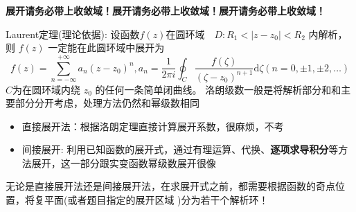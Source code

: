 \documentclass[a4paper,11pt,UTF8]{article}
\begin{document}
\begin{enumerate}
	\textbf{展开请务必带上收敛域！展开请务必带上收敛域！展开请务必带上收敛域！}
	
	Laurent定理(理论依据): 设函数$f(z)$在圆环域$\quad D{:}R_1<|z-z_0|<R_2$ 内解析，则 $f(z)$ 一定能在此圆环域中展开为
	$$
	f(z)=\sum_{n=-\infty}^{+\infty}a_n(z-z_0)^n,a_n=\frac1{2\pi i}\oint_C\frac{f(\zeta)}{\left(\zeta-z_0\right)^{n+1}}\mathrm{d}\zeta(n=0,\pm1,\pm2,\ldots)
	$$
	$C$为在圆环域内绕 $z_0$ 的任何一条简单闭曲线。
	洛朗级数一般是将解析部分和和主要部分分开考虑，处理方法仍然和幂级数相同
	\begin{itemize}
		\item 直接展开法：根据洛朗定理直接计算展开系数，很麻烦，不考
		\item 间接展开: 利用已知函数的展开式，通过有理运算、代换、\textbf{逐项求导积分}等方法展开，这一部分跟实变函数幂级数展开很像
	\end{itemize}
	无论是直接展开法还是间接展开法，在求展开式之前，都需要根据函数的奇点位置，将复平面(或者题目指定的展开区域 )分为若干个解析环！
\end{enumerate}
\end{document}
